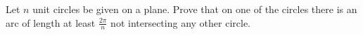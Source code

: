Let $n$ unit circles be given on a plane. Prove that on one of the circles there is an arc of length at least $\frac{2\pi}n$ not intersecting any other circle.